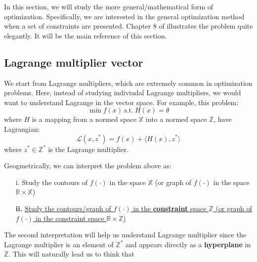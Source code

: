 In this section, we will study the more general/mathematical form of optimization. Specifically, we are interested in the general optimization method when a set of constraints are presented.
Chapter 8 of \citet{luenberger1997optimization} illustrates the problem quite elegantly. It will be the main reference of this section.

\subsection{Lagrange multiplier vector}
We start from Lagrange multipliers, which are extremely common in optimization problems. Here, instead of studying indiviudal Lagrange multipliers, we would want to understand Lagrange in the vector space. For example, this problem:
$$\min f(x)\ \text{s.t.}\ H(x)=\theta$$
where $H$ is a mapping from a normed space $\mathbb{X}$ into a normed space $\mathbb{Z}$, have Lagrangian:
$$\mathcal{L}(x,z^*)=f(x)+\langle H(x),z^*\rangle$$
where $z^*\in \mathbb{Z}^*$ is the Lagrange multiplier. 

Geogmetrically, we can interpret the problem above as:
\begin{enumerate}
    \item[i.] Study the contours of $f(\cdot)$ in the space $\mathbb{X}$ (or graph of $f(\cdot)$ in the space $\mathbb{R}\times \mathbb{X}$)
    \item[\textbf{ii.}] \underline{Study the contours/graph of $f(\cdot)$ in the \textbf{constraint} space $\mathbb{Z}$ (or graph of $f(\cdot)$ in the constraint space $\mathbb{R}\times \mathbb{Z}$)}
\end{enumerate}

The second interpretation will help us understand Lagrange multiplier since the Lagrange multiplier is an element of $\mathbb{Z}^*$ and appears directly as a \textbf{hyperplane} in $\mathbb{Z}$.
This will naturally lead us to think that 